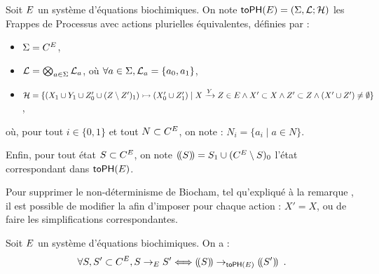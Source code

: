 \begin{definition}
  Soit $E$ un système d'équations biochimiques.
  On note $\mathsf{toPH}(E) = (\Sigma, \mathcal{L}; \mathcal{H})$ les Frappes de Processus avec actions plurielles
  équivalentes, définies par :
  \begin{itemize}
    \item $\Sigma = C^{E}$,
    \item $\mathcal{L} = \bigotimes_{a \in \Sigma} \mathcal{L}_a$, où $\forall a \in \Sigma, \mathcal{L}_a = \{ a_0, a_1 \}$,
    \item $\mathcal{H} = \{
      \mbox{$(X_1 \cup Y_1 \cup Z'_0 \cup (Z \setminus Z')_1) \rightarrowtail (X'_0 \cup Z'_1)$} \mid
      X \xrightarrow{Y} Z \in E \wedge X' \subset X \wedge Z' \subset Z \wedge
      (X' \cup Z') \neq \emptyset \}$,
%     
%     
  \end{itemize}
  où, pour tout $i \in \{ 0, 1 \}$ et tout $N \subset C^{E}$, on note :
  $N_i = \{ a_i \mid a \in N \}$.
  
  Enfin, pour tout état $S \subset C^{E}$, on note
  $(\!(S)\!) = S_1 \cup (C^{E} \setminus S)_0$
  l'état correspondant dans $\mathsf{toPH}(E)$.
\end{definition}

\begin{remark}
  Pour supprimer le non-déterminisme de Biocham,
  tel qu'expliqué à la remarque ,
  il est possible de modifier la 
  afin d'imposer pour chaque action : $X' = X$,
  ou de faire les simplifications correspondantes.
\end{remark}

\begin{theorem}[$\PH \approx \bctophm$]
  Soit $E$ un système d'équations biochimiques.
  On a :
  \[\forall S, S' \subset C^{E}, S \rightarrow_{E} S' \Longleftrightarrow
    (\!(S)\!) \rightarrow_{\mathsf{toPH}(E)} (\!(S')\!) \enspace.\]
\end{theorem}

